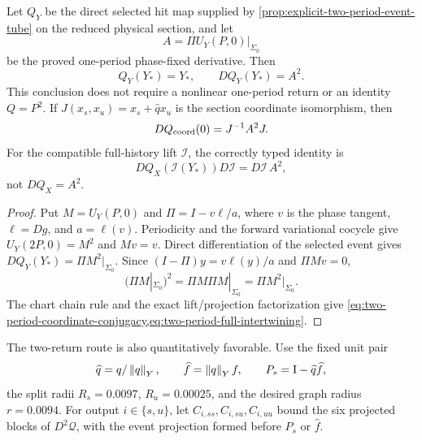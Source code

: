 \begin{proposition}
\label{prop:direct-two-period-derivative}
Let \(Q_Y\) be the direct selected hit map supplied by
\cref{prop:explicit-two-period-event-tube} on the reduced physical section,
and let
\[
 A=\Pi U_Y(P,0)|_{\Sigma_0}
\]
be the proved one-period phase-fixed derivative.  Then
\begin{equation}
 Q_Y(Y_*)=Y_*,\qquad DQ_Y(Y_*)=A^2.                    \label{eq:direct-two-period-derivative}
\end{equation}
This conclusion does not require a nonlinear one-period return or an
identity \(Q=P^2\).  If \(J(x_s,x_u)=x_s+\widehat qx_u\) is the section
coordinate isomorphism, then
\begin{equation}
 DQ_{\rm coord}(0)=J^{-1}A^2J.                         \label{eq:two-period-coordinate-conjugacy}
\end{equation}
For the compatible full-history lift \(\mathcal I\), the correctly typed
identity is
\begin{equation}
 DQ_X(\mathcal I(Y_*))D\mathcal I=D\mathcal I\,A^2,   \label{eq:two-period-full-intertwining}
\end{equation}
not \(DQ_X=A^2\).
\end{proposition}

\begin{proof}
Put \(M=U_Y(P,0)\) and
\(\Pi=I-v\ell/a\), where \(v\) is the phase tangent,
\(\ell=Dg\), and \(a=\ell(v)\).  Periodicity and the forward variational
cocycle give \(U_Y(2P,0)=M^2\) and \(Mv=v\).  Direct differentiation of the
selected event gives \(DQ_Y(Y_*)=\Pi M^2|_{\Sigma_0}\).  Since
\((I-\Pi)y=v\ell(y)/a\) and \(\Pi Mv=0\),
\[
 (\Pi M|_{\Sigma_0})^2=\Pi M\Pi M|_{\Sigma_0}
 =\Pi M^2|_{\Sigma_0}.
\]
The chart chain rule and the exact lift/projection factorization give
\cref{eq:two-period-coordinate-conjugacy,eq:two-period-full-intertwining}.
\end{proof}

The two-return route is also quantitatively favorable.  Use the fixed unit
pair
\[
 \widehat q=q/\left\lVert q\right\rVert_Y,\qquad
 \widehat f=\left\lVert q\right\rVert_Y f,\qquad P_s=\mathrm I-\widehat q\widehat f,
\]
the split radii \(R_s=0.0097\), \(R_u=0.00025\), and the desired graph radius
\(r=0.0094\).  For output \(i\in\{s,u\}\), let
\(C_{i,ss},C_{i,su},C_{i,uu}\) bound the six projected blocks of
\(D^2\mathcal Q\), with the event projection formed before \(P_s\) or
\(\widehat f\).

